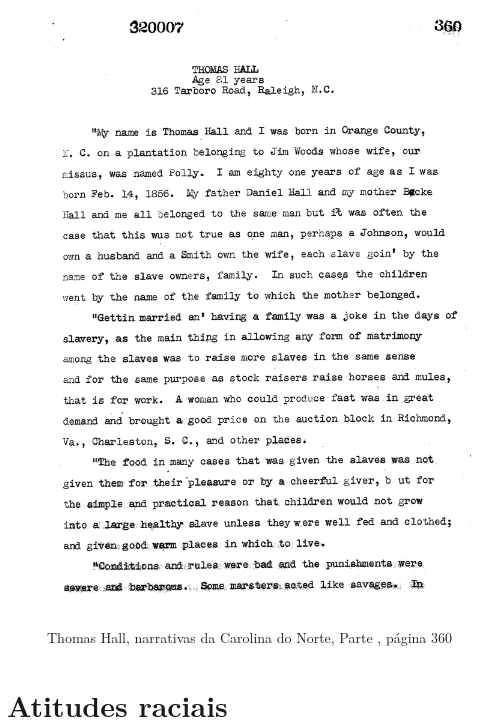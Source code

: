 \begin{absolutelynopagebreak}
\begin{vplace}
\begin{figure}[H]
\begin{adjustwidth}{-1.8cm}{}
  \vspace*{-2cm}
  \includegraphics[width=130mm]{./imgs/Cap5.jpg}  
\end{adjustwidth}
  \caption{Thomas Hall, narrativas da Carolina do Norte, Parte , página 360}
\end{figure}
\end{vplace}

\end{absolutelynopagebreak}

\chapter{Atitudes raciais}

